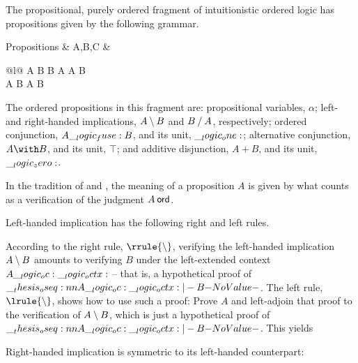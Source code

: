The propositional, purely ordered fragment of intuitionistic ordered logic has propositions given by the following grammar.
\begin{syntax*}
  Propositions &
    A,B,C & \begin{array}[t]{@{}l@{}}
              \alpha \mid A \limp B \mid B \pmir A
                \mid A \fuse B \mid \one \\
              \mathllap{\mid {}} A \with B \mid \top
                \mid A \plus B \mid \zero
            \end{array}
\end{syntax*}
The ordered propositions in this fragment are:
propositional variables, $\alpha$;
left- and right-handed implications, $A \mathbin { \setminus } B$ and $B \mathbin { / } A$, respectively;
ordered conjunction, $A \__logic_fuse: B$, and its unit, $\__logic_one:$;
alternative conjunction, $A \with B$, and its unit, $\top$;
and
additive disjunction, $A \plus B$, and its unit, $\__logic_zero:$.

In the tradition of \citeauthor{Gentzen:MZ35} and \citeauthor{Martin-Lof:NJPL96}\autocites{Gentzen:MZ35}{Martin-Lof:NJPL96}, the meaning of a proposition $A$ is given by what counts as a verification of the judgment $A \ord$.

Left-handed implication has the following right and left rules.
According to the right rule, $\rrule{\limp}$, verifying the left-handed implication $A \mathbin { \setminus } B$ amounts to verifying $B$ under the left-extended context $A \__logic_oc: \__logic_octx:$ -- that is, a hypothetical proof of $\oseq{A \oc \octx |- B}$.
The left rule, $\lrule{\limp}$, shows how to use such a proof:
Prove $A$ and left-adjoin that proof to the verification of $A \mathbin { \setminus } B$, which is just a hypothetical proof of $\oseq{A \oc \octx |- B}$.
This yields 

Right-handed implication is symmetric to its left-handed counterpart:

